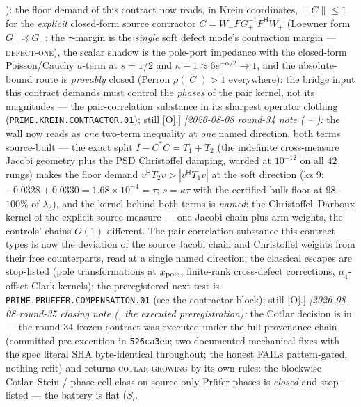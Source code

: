 \documentclass[11pt,a4paper]{article}
\begin{document}
{{):} the floor demand
of this contract now reads, in Krein coordinates, $\|C\| \le 1$
for the \emph{explicit} closed-form source contractor $C =
W_-FG_+^{-1}F^{\mathsf H}W_+$ (Loewner form $G_- \preceq G_+$;
the $\tau$-margin is the \emph{single} soft defect mode's
contraction margin --- \textsc{defect-one}), the scalar shadow
is the pole-port impedance with the closed-form Poisson/Cauchy
$a$-term at $s = 1/2$ and $\kappa - 1 \approx 6e^{-\alpha/2}
\to 1$, and the absolute-bound route is \emph{provably} closed
(Perron $\rho(|C|) > 1$ everywhere): the bridge input this
contract demands must control the \emph{phases} of the pair
kernel, not its magnitudes --- the pair-correlation substance
in its sharpest operator clothing
(\texttt{PRIME.KREIN.CONTRACTOR.01}); still [O].]
\emph{[2026-08-08 round-34 note
( --
):} the wall now reads as
\emph{one} two-term inequality at \emph{one} named direction,
both terms source-built --- the exact split $I - C^*C = T_1 +
T_2$ (the indefinite cross-measure Jacobi geometry plus the PSD
Christoffel damping, warded at $10^{-12}$ on all $42$ rungs)
makes the floor demand $v^{\mathsf H}T_2v > |v^{\mathsf H}T_1v|$
at the soft direction (kz 9: $-0.0328 + 0.0330 = 1.68\times
10^{-4} = \tau$; $s = \kappa\tau$ with the certified bulk floor
at $98$--$100\%$ of $\lambda_2$), and the kernel behind both
terms is \emph{named}: the Christoffel--Darboux kernel of the
explicit source measure --- one Jacobi chain plus arm weights,
the controls' chains $O(1)$ different.  The pair-correlation
substance this contract types is now the deviation of the source
Jacobi chain and Christoffel weights from their free
counterparts, read at a single named direction; the classical
escapes are stop-listed (pole transformations at $x_{\rm pole}$,
finite-rank cross-defect corrections, $\mu_4$-offset Clark
kernels); the preregistered next test is
\texttt{PRIME.PRUEFER.COMPENSATION.01} (see the contractor
block); still [O].]
\emph{[2026-08-08 round-35 closing note
(, the executed
preregistration):} the Cotlar decision is in --- the round-34
frozen contract was executed under the full provenance chain
(committed pre-execution in \texttt{526ca3eb}; two documented
mechanical fixes with the spec literal SHA byte-identical
throughout; the honest FAILs pattern-gated, nothing refit) and
returns \textsc{cotlar-growing} by its own rules: the blockwise
Cotlar--Stein / phase-cell class on source-only Pr\"ufer phases
is \emph{closed} and stop-listed --- the battery is flat ($S_U$
}
\end{document}
